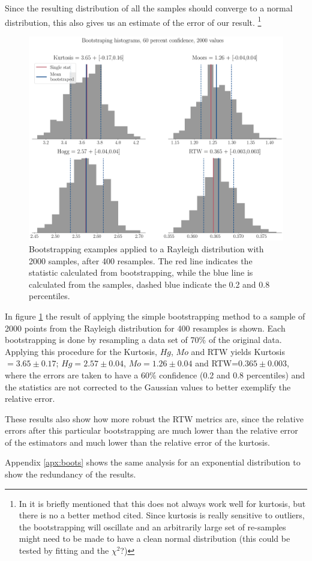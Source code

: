 	Since the resulting distribution of all the samples should converge to a normal distribution, this also gives us an estimate of the error of our result. 
	\footnote{In \cite{Wright2011} it is briefly mentioned that this does not always work well for kurtosis, but there is no a better method cited. Since kurtosis is really sensitive to outliers, the bootstrapping will oscillate  and an arbitrarily large set of re-samples might need to be made to have a clean normal distribution (this could be tested by fitting and the $\chi^2$?)}

	

\begin{figure}[H]
\centering
\includegraphics[width=\columnwidth]{Images/Metrics/boot_histograms_rayleigh_2000_400.png}
\caption{ Bootstrapping examples applied to a Rayleigh distribution with 2000 samples, after 400 resamples. The red line indicates the statistic calculated from bootstrapping, while the blue line is calculated from the samples, dashed blue indicate the 0.2 and 0.8 percentiles.  }
\label{fig:Boots_example}
\end{figure}

In figure \ref{fig:Boots_example}  the result of applying the simple bootstrapping method to a sample of 2000 points from the Rayleigh distribution for 400 resamples is shown.
Each bootstrapping is done by resampling a data set of 70\% of the original data.
Applying this procedure for the Kurtosis,  $Hg$,  $Mo$ and  RTW yields Kurtosis$=3.65\pm 0.17$; $Hg=2.57\pm 0.04$, $Mo=1.26\pm 0.04$ and RTW=$0.365\pm 0.003$, where the errors are taken to have a $60\%$ confidence (0.2 and 0.8 percentiles) and the statistics are not corrected to the Gaussian values to better exemplify the relative error.

These results also show how more robust the RTW metrics are, since the relative errors after this particular bootstrapping are much lower than the relative error of the estimators and much lower than the relative error of the kurtosis.    

Appendix \ref{apx:boots} shows the same analysis for an exponential distribution to show the redundancy of the results.